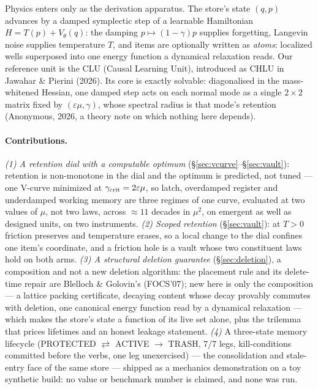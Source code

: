 \documentclass{article}
\begin{document}
Physics enters only as the derivation apparatus. The store's state $(q,p)$ advances by a damped symplectic step of a learnable Hamiltonian $H=T(p)+V_\theta(q)$: the damping $p\mapsto(1-\gamma)p$ supplies forgetting, Langevin noise supplies temperature $T$, and items are optionally written as \emph{atoms}: localized wells superposed into one energy function a dynamical relaxation reads. Our reference unit is the CLU (Causal Learning Unit), introduced as CHLU in Jawahar \& Pierini (2026). Its core is exactly solvable: diagonalised in the mass-whitened Hessian, one damped step acts on each normal mode as a single $2\times2$ matrix fixed by $(\varepsilon\mu,\gamma)$, whose spectral radius is that mode's retention (Anonymous, 2026, a theory note on which nothing here depends).

\paragraph{Contributions.} \emph{(1) A retention dial with a computable optimum} (\S\ref{sec:vcurve}--\S\ref{sec:vault}): retention is non-monotone in the dial and the optimum is predicted, not tuned --- one V-curve minimized at $\gamma_{\rm crit}=2\varepsilon\mu$, so latch, overdamped register and underdamped working memory are three regimes of one curve, evaluated at two values of $\mu$, not two laws, across $\approx11$ decades in $\mu^2$, on emergent as well as designed units, on two instruments. \emph{(2) Scoped retention} (\S\ref{sec:vault}): at $T>0$ friction preserves and temperature erases, so a local change to the dial confines one item's coordinate, and a friction hole is a vault whose two constituent laws hold on both arms. \emph{(3) A structural deletion guarantee} (\S\ref{sec:deletion}), a composition and not a new deletion algorithm: the placement rule and its delete-time repair are Blelloch \& Golovin's (FOCS'07); new here is only the composition --- a lattice packing certificate, decaying content whose decay provably commutes with deletion, one canonical energy function read by a dynamical relaxation --- which makes the store's state a function of its live set alone, plus the trilemma that prices lifetimes and an honest leakage statement. \emph{(4)} A three-state memory lifecycle (PROTECTED $\rightleftarrows$ ACTIVE $\to$ TRASH, 7/7 legs, kill-conditions committed before the verbs, one leg unexercised) --- the consolidation and stale-entry face of the same store --- shipped as a mechanics demonstration on a toy synthetic build: no value or benchmark number is claimed, and none was run.
\end{document}
